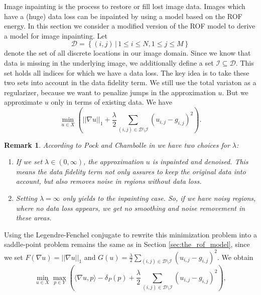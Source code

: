\documentclass[abstracton]{scrreprt}
\newtheorem{remark}[theorem]{Remark}
\begin{document}
        Image inpainting is the process to restore or fill lost image data. Images which have a (huge) data loss can be inpainted by using a model based on the ROF energy. In this section we consider a modified version of the ROF model to derive a model for image inpainting. Let
            $$
                \mathcal{D} = \left\{ (i, j) \, | \, 1 \le i \le N, 1 \le j \le M \right\}
            $$
        denote the set of all discrete locations in our image domain. Since we know that data is missing in the underlying image, we additionally define a set $\mathcal{I} \subseteq \mathcal{D}$. This set holds all indices for which we have a data loss. The key idea is to take these two sets into account in the data fidelity term. We still use the total variaton as a regularizer, because we want to penalize jumps in the approximation $u$. But we approximate $u$ only in terms of existing data. We have
            \begin{equation}
                \min_{u \in X} \left( ||\nabla u||_{1} + \frac{\lambda}{2} \sum_{(i,j) \in \mathcal{D} \setminus \mathcal{I}} (u_{i,j} - g_{i,j})^{2} \right).
                \label{eq:inpainting_model}
            \end{equation}
        \begin{remark}
            According to Pock and Chambolle in \cite{Chambolle10afirst-order} we have two choices for $\lambda$:
                \begin{enumerate}
                    \item If we set $\lambda \in (0, \infty)$, the approximation $u$ is inpainted and denoised. This means the data fidelity term not only assures to keep the original data into account, but also removes noise in regions without data loss.
                    \item Setting $\lambda = \infty$ only yields to the inpainting case. So, if we have noisy regions, where no data loss appears, we get no smoothing and noise removement in these areas.
                \end{enumerate}
        \end{remark}
        Using the Legendre-Fenchel conjugate to rewrite this minimization problem into a saddle-point problem remains the same as in Section \ref{sec:the_rof_model}, since we set $F(\nabla u) = ||\nabla u||_{1}$ and $G(u) = \frac{\lambda}{2} \sum_{(i,j) \in \mathcal{D} \setminus \mathcal{I}} (u_{i,j} - g_{i,j})^{2}$. We obtain
            \begin{equation}
                \min_{u \in X} \max_{p \in Y} \left( \langle \nabla u, p \rangle  - \delta_{P}(p) + \frac{\lambda}{2} \sum_{(i,j) \in \mathcal{D} \setminus \mathcal{I}} (u_{i,j} - g_{i,j})^{2} \right),
                \label{eq:inpainting_primal_dual}
            \end{equation}
\end{document}
